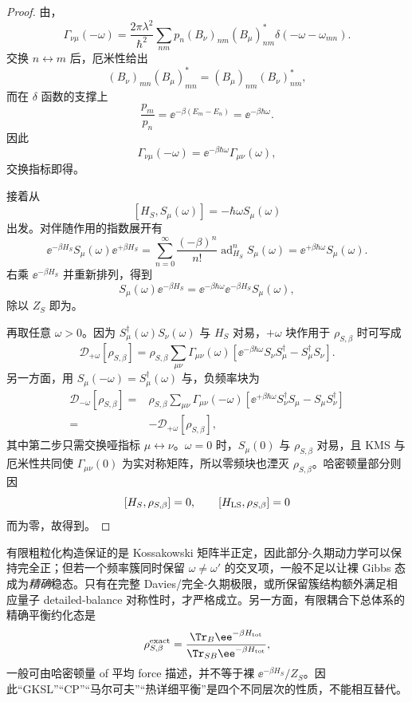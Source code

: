 \begin{proof}
由，
\[
\Gamma_{\nu\mu}(-\omega)
=\frac{2\pi\lambda^2}{\hbar^2}
\sum_{nm}p_n
(B_\nu)_{nm}(B_\mu)_{nm}^*
\delta(-\omega-\omega_{mn}).
\]
交换 $n\leftrightarrow m$ 后，厄米性给出
\[
(B_\nu)_{mn}(B_\mu)_{mn}^*
=(B_\mu)_{nm}(B_\nu)_{nm}^*,
\]
而在 \(\delta\) 函数的支撑上
\[
\frac{p_m}{p_n}
=\ee^{-\beta(E_m-E_n)}
=\ee^{-\beta\hbar\omega}.
\]
因此
\[
\Gamma_{\nu\mu}(-\omega)
=\ee^{-\beta\hbar\omega}\Gamma_{\mu\nu}(\omega),
\]
交换指标即得。

接着从
\[
[H_S,S_\mu(\omega)]=-\hbar\omega S_\mu(\omega)
\]
出发。对伴随作用的指数展开有
\[
\ee^{-\beta H_S}S_\mu(\omega)\ee^{+\beta H_S}
=\sum_{n=0}^{\infty}
\frac{(-\beta)^n}{n!}\operatorname{ad}_{H_S}^nS_\mu(\omega)
=\ee^{+\beta\hbar\omega}S_\mu(\omega).
\]
右乘 $\ee^{-\beta H_S}$ 并重新排列，得到
\[
S_\mu(\omega)\ee^{-\beta H_S}
=\ee^{-\beta\hbar\omega}
\ee^{-\beta H_S}S_\mu(\omega),
\]
除以 $Z_S$ 即为。

再取任意 $\omega>0$。因为 $S_\mu^\dagger(\omega)S_\nu(\omega)$ 与 $H_S$ 对易，$+\omega$ 块作用于 $\rho_{S,\beta}$ 时可写成
\[
\mathcal D_{+\omega}[\rho_{S,\beta}]
=\rho_{S,\beta}
\sum_{\mu\nu}\Gamma_{\mu\nu}(\omega)
\left[
\ee^{-\beta\hbar\omega}S_\nu S_\mu^\dagger
-S_\mu^\dagger S_\nu
\right].
\]
另一方面，用 $S_\mu(-\omega)=S_\mu^\dagger(\omega)$ 与，负频率块为
\[
\begin{aligned}
\mathcal D_{-\omega}[\rho_{S,\beta}]
={}&\rho_{S,\beta}
\sum_{\mu\nu}\Gamma_{\mu\nu}(-\omega)
\left[
\ee^{+\beta\hbar\omega}S_\nu^\dagger S_\mu
-S_\mu S_\nu^\dagger
\right]\\
={}&-\mathcal D_{+\omega}[\rho_{S,\beta}],
\end{aligned}
\]
其中第二步只需交换哑指标 $\mu\leftrightarrow\nu$。$\omega=0$ 时，$S_\mu(0)$ 与 $\rho_{S,\beta}$ 对易，且 KMS 与厄米性共同使 $\Gamma_{\mu\nu}(0)$ 为实对称矩阵，所以零频块也湮灭 $\rho_{S,\beta}$。哈密顿量部分则因
\[
[H_S,\rho_{S,\beta}]=0,
\qquad
[H_{\rm LS},\rho_{S,\beta}]=0
\]
而为零，故得到。
\end{proof}

\begin{note}
有限粗粒化构造保证的是 Kossakowski 矩阵半正定，因此部分-久期动力学可以保持完全正；但若一个频率簇同时保留 $\omega\neq\omega'$ 的交叉项，一般不足以让裸 Gibbs 态成为\emph{精确}稳态。只有在完整 Davies/完全-久期极限，或所保留簇结构额外满足相应量子 detailed-balance 对称性时，才严格成立。另一方面，有限耦合下总体系的精确平衡约化态是
\[
\rho_{S,\beta}^{\rm exact}
=\frac{\Tr_B\ee^{-\beta H_{\rm tot}}}
{\Tr_{SB}\ee^{-\beta H_{\rm tot}}},
\]
一般可由哈密顿量 of 平均 force 描述，并不等于裸 $\ee^{-\beta H_S}/Z_S$。因此“GKSL”“CP”“马尔可夫”“热详细平衡”是四个不同层次的性质，不能相互替代。
\end{note}
